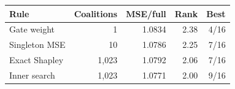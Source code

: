 \begin{tabular}{lrrrr}
\toprule
Rule & Coalitions & MSE/full & Rank & Best \\
\midrule
Gate weight & 1 & 1.0834 & 2.38 & 4/16 \\
Singleton MSE & 10 & 1.0786 & 2.25 & 7/16 \\
Exact Shapley & 1,023 & 1.0792 & 2.06 & 7/16 \\
Inner search & 1,023 & 1.0771 & 2.00 & 9/16 \\
\bottomrule
\end{tabular}
